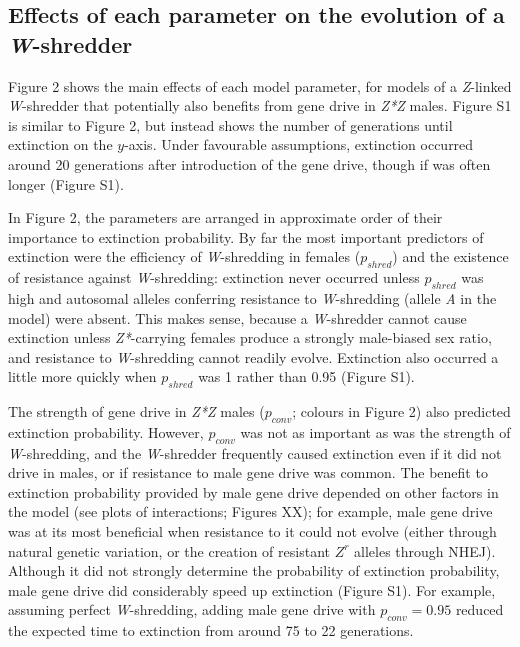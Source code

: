 \documentclass[]{rsos}%
\begin{document}
\hypertarget{effects-of-each-parameter-on-the-evolution-of-a-w-shredder}{%
\subsection{\texorpdfstring{Effects of each parameter on the evolution
of a
\emph{W}-shredder}{Effects of each parameter on the evolution of a W-shredder}}\label{effects-of-each-parameter-on-the-evolution-of-a-w-shredder}}

Figure 2 shows the main effects of each model parameter, for models of a
\emph{Z}-linked \emph{W}-shredder that potentially also benefits from
gene drive in \emph{Z*Z} males. Figure S1 is similar to Figure 2, but
instead shows the number of generations until extinction on the
\(y\)-axis. Under favourable assumptions, extinction occurred around 20
generations after introduction of the gene drive, though if was often
longer (Figure S1).

In Figure 2, the parameters are arranged in approximate order of their
importance to extinction probability. By far the most important
predictors of extinction were the efficiency of \emph{W}-shredding in
females (\(p_{shred}\)) and the existence of resistance against
\emph{W}-shredding: extinction never occurred unless \(p_{shred}\) was
high and autosomal alleles conferring resistance to \emph{W}-shredding
(allele \emph{A} in the model) were absent. This makes sense, because a
\emph{W}-shredder cannot cause extinction unless \emph{Z*}-carrying
females produce a strongly male-biased sex ratio, and resistance to
\emph{W}-shredding cannot readily evolve. Extinction also occurred a
little more quickly when \(p_{shred}\) was 1 rather than 0.95 (Figure
S1).

The strength of gene drive in \emph{Z*Z} males (\(p_{conv}\); colours in
Figure 2) also predicted extinction probability. However, \(p_{conv}\)
was not as important as was the strength of \emph{W}-shredding, and the
\emph{W}-shredder frequently caused extinction even if it did not drive
in males, or if resistance to male gene drive was common. The benefit to
extinction probability provided by male gene drive depended on other
factors in the model (see plots of interactions; Figures XX); for
example, male gene drive was at its most beneficial when resistance to
it could not evolve (either through natural genetic variation, or the
creation of resistant \(Z^r\) alleles through NHEJ). Although it did not
strongly determine the probability of extinction probability, male gene
drive did considerably speed up extinction (Figure S1). For example,
assuming perfect \emph{W}-shredding, adding male gene drive with
\(p_{conv} = 0.95\) reduced the expected time to extinction from around
75 to 22 generations.
\end{document}
